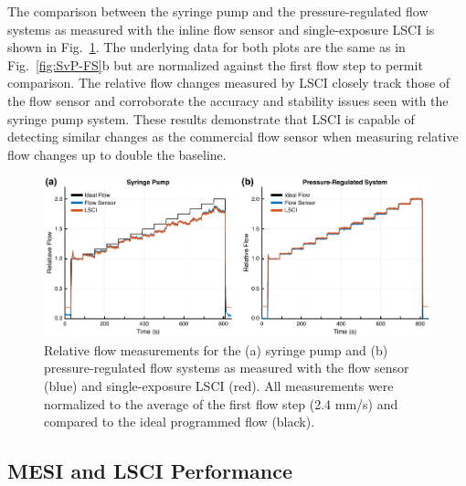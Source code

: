 \documentclass[12pt]{spieman}
\begin{document}
\begin{spacing}{2}
The comparison between the syringe pump and the pressure-regulated flow systems as measured with the inline flow sensor and single-exposure LSCI is shown in Fig.~\ref{fig:SvP-FS_LSCI}. The underlying data for both plots are the same as in Fig.~\ref{fig:SvP-FS}b but are normalized against the first flow step to permit comparison. The relative flow changes measured by LSCI closely track those of the flow sensor and corroborate the accuracy and stability issues seen with the syringe pump system. These results demonstrate that LSCI is capable of detecting similar changes as the commercial flow sensor when measuring relative flow changes up to double the baseline. 

\begin{figure}
    \includegraphics[width=\textwidth]{Figure5.pdf}
    \caption {
        Relative flow measurements for the (a) syringe pump and (b) pressure-regulated flow systems as measured with the flow sensor (blue) and single-exposure LSCI (red). All measurements were normalized to the average of the first flow step (2.4 mm/s) and compared to the ideal programmed flow (black).
    }
    \label{fig:SvP-FS_LSCI}
\end{figure}


\subsection{MESI and LSCI Performance}


\end{spacing}
\end{document}
